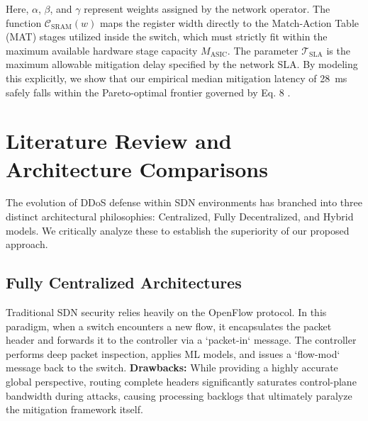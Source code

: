 \documentclass[sigconf, nonacm]{acmart}
\begin{document}
\noindent Here, $\alpha$, $\beta$, and $\gamma$ represent weights assigned by the network operator. The function $\mathcal{C}_{\text{SRAM}}(w)$ maps the register width directly to the Match-Action Table (MAT) stages utilized inside the switch, which must strictly fit within the maximum available hardware stage capacity $M_{\text{ASIC}}$. The parameter $\mathcal{T}_{\text{SLA}}$ is the maximum allowable mitigation delay specified by the network SLA. By modeling this explicitly, we show that our empirical median mitigation latency of 28~ms safely falls within the Pareto-optimal frontier governed by Eq. 8 .

\section{Literature Review and Architecture Comparisons}

The evolution of DDoS defense within SDN environments has branched into three distinct architectural philosophies: Centralized, Fully Decentralized, and Hybrid models. We critically analyze these to establish the superiority of our proposed approach.

\subsection{Fully Centralized Architectures}
Traditional SDN security relies heavily on the OpenFlow protocol. In this paradigm, when a switch encounters a new flow, it encapsulates the packet header and forwards it to the controller via a `packet-in` message. The controller performs deep packet inspection, applies ML models, and issues a `flow-mod` message back to the switch. 
\textbf{Drawbacks:} While providing a highly accurate global perspective, routing complete headers significantly saturates control-plane bandwidth during attacks, causing processing backlogs that ultimately paralyze the mitigation framework itself.
\end{document}
